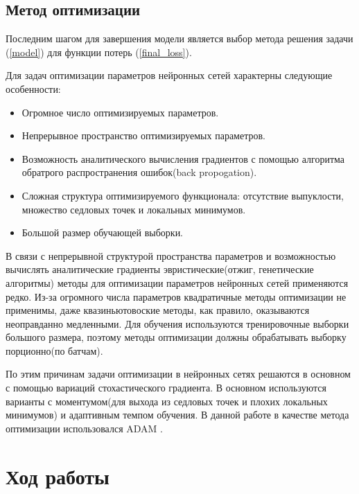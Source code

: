 \documentclass[14pt, a4paper, oneside, bold]{extarticle}
\begin{document}
\subsection{Метод оптимизации}

Последним шагом для завершения модели является выбор метода решения 
задачи (\ref{model}) для функции потерь (\ref{final_loss}).

Для задач оптимизации параметров нейронных сетей характерны следующие особенности:
\begin{itemize}
	\item Огромное число оптимизируемых параметров.
	
	\item Непрерывное пространство оптимизируемых параметров.
	
	\item Возможность аналитического вычисления градиентов с помощью
алгоритма обратрого распространения ошибок(back propogation).
		
	\item Сложная структура оптимизируемого функционала: отсутствие 	выпуклости, множество седловых точек и локальных минимумов.
	
	\item Большой размер обучающей выборки.
	
\end{itemize} 
	
В связи с непрерывной структурой пространства параметров и возможностью вычислять аналитические градиенты эвристические(отжиг, генетические алгоритмы) методы для оптимизации параметров нейронных сетей применяются редко. Из-за огромного числа параметров квадратичные методы оптимизации не применимы, даже квазиньютовоские методы, как правило, оказываются неоправданно медленными. Для обучения используются тренировочные выборки большого размера, поэтому методы оптимизации должны обрабатывать выборку порционно(по батчам). 

По этим причинам задачи оптимизации в нейронных сетях решаются в основном с помощью вариаций стохастического градиента. В основном используются варианты с моментумом(для выхода из седловых точек и плохих локальных минимумов) и адаптивным темпом обучения. В данной работе в качестве метода оптимизации использовался ADAM \cite{19}.

\newpage


\section{Ход работы} \label{seg_tasks}
\end{document}
